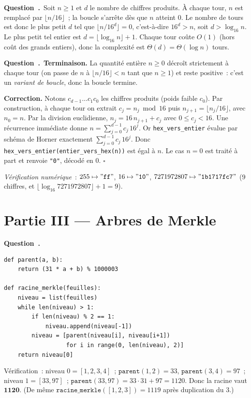 \documentclass[11pt,a4paper]{article}
\newcounter{qcnt}
\newcommand{\Q}{\medskip\par\stepcounter{qcnt}\noindent\textbf{Question~\theqcnt.}~}
\newcommand{\code}[1]{\lstinline!#1!}
\begin{document}
\Q Soit $n \ge 1$ et $d$ le nombre de chiffres produits. À chaque tour, $n$ est remplacé par
$\lfloor n/16 \rfloor$~; la boucle s'arrête dès que $n$ atteint $0$. Le nombre de tours est donc
le plus petit $d$ tel que $\lfloor n / 16^{d} \rfloor = 0$, c'est-à-dire $16^{d} > n$, soit
$d > \log_{16} n$. Le plus petit tel entier est $d = \lfloor \log_{16} n \rfloor + 1$. Chaque tour
coûte $O(1)$ (hors coût des grands entiers), donc la complexité est $\Theta(d) = \Theta(\log n)$
tours.

\Q \textbf{Terminaison.} La quantité entière $n \ge 0$ décroît strictement à chaque tour
(on passe de $n$ à $\lfloor n/16 \rfloor < n$ tant que $n \ge 1$) et reste positive~: c'est un
\emph{variant de boucle}, donc la boucle termine.

\noindent\textbf{Correction.} Notons $c_{d-1}\dots c_1 c_0$ les chiffres produits (poids faible
$c_0$). Par construction, à chaque tour on extrait $c_j = n_j \bmod 16$ puis $n_{j+1} =
\lfloor n_j / 16\rfloor$, avec $n_0 = n$. Par la division euclidienne, $n_j = 16\,n_{j+1} + c_j$
avec $0 \le c_j < 16$. Une récurrence immédiate donne $n = \sum_{j=0}^{d-1} c_j\, 16^{j}$. Or
\code{hex_vers_entier} évalue par schéma de Horner exactement $\sum_{j=0}^{d-1} c_j\,16^{j}$. Donc
\code{hex_vers_entier(entier_vers_hex(n))} est égal à $n$. Le cas $n=0$ est traité à part et renvoie
\code{"0"}, décodé en $0$. $\square$

\medskip
\noindent\emph{Vérification numérique}~: $255 \mapsto \mathtt{"ff"}$, $16 \mapsto \mathtt{"10"}$,
$7271972807 \mapsto \mathtt{"1b1717fc7"}$ ($9$ chiffres, et $\lfloor\log_{16}
7271972807\rfloor+1 = 9$).

\section*{Partie III --- Arbres de Merkle}

\Q
\begin{lstlisting}
def parent(a, b):
    return (31 * a + b) % 1000003

def racine_merkle(feuilles):
    niveau = list(feuilles)
    while len(niveau) > 1:
        if len(niveau) % 2 == 1:
            niveau.append(niveau[-1])
        niveau = [parent(niveau[i], niveau[i+1])
                  for i in range(0, len(niveau), 2)]
    return niveau[0]
\end{lstlisting}
Vérification~: niveau $0 = [1,2,3,4]$~; $\mathtt{parent}(1,2)=33$, $\mathtt{parent}(3,4)=97$~; niveau
$1 = [33,97]$~; $\mathtt{parent}(33,97)=33\cdot31+97=1120$. Donc la racine vaut $\mathbf{1120}$.
(De même $\mathtt{racine\_merkle}([1,2,3])=1119$ après duplication du $3$.)
\end{document}
